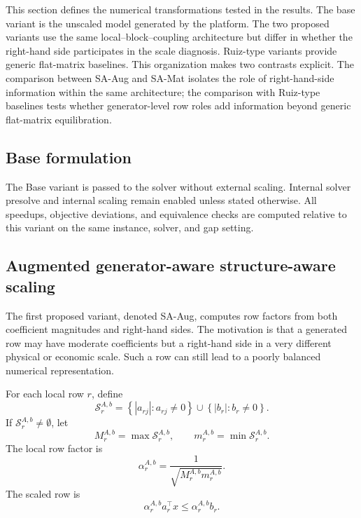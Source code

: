 \documentclass[AMA,Times1COL]{WileyNJDv5} %
\newcommand{\abs}[1]{\left\lvert #1 \right\rvert}
\newcommand{\methodBase}{Base}
\newcommand{\methodAug}{SA-Aug}
\newcommand{\methodMat}{SA-Mat}
\providecommand{\DIFadd}[1]{{\protect\color{blue} \sf #1}} %
\providecommand{\DIFdel}[1]{{\protect\color{red} \scriptsize #1}} %
\providecommand{\DIFaddbegin}{} %
\providecommand{\DIFaddend}{} %
\providecommand{\DIFdelbegin}{} %
\providecommand{\DIFdelend}{} %
\begin{document}
This section defines the numerical transformations tested in the results. The base variant is the unscaled model generated by the platform. The two proposed variants use the same local--block--coupling architecture but differ in whether the right-hand side participates in the scale diagnosis. Ruiz-type variants provide generic flat-matrix baselines. This organization makes two contrasts explicit. The comparison between \methodAug{} and \methodMat{} isolates the role of right-hand-side information within the same architecture; the comparison with Ruiz-type baselines tests whether generator-level row roles add information beyond generic flat-matrix equilibration.

\subsection{Base formulation}

The \methodBase{} variant is passed to the solver without external scaling. Internal
solver presolve and internal scaling remain enabled unless stated otherwise. All
speedups, objective deviations, and equivalence checks are computed relative to this
variant on the same instance, solver, and gap setting.

\subsection{Augmented \DIFdelbegin \DIFdel{generator-aware }\DIFdelend \DIFaddbegin \DIFadd{structure-aware }\DIFaddend scaling}
\label{subsec:strategy-1}

The first proposed variant, denoted \methodAug{}, computes row factors from both
coefficient magnitudes and right-hand sides. The motivation is that a generated row may
have moderate coefficients but a right-hand side in a very different physical or economic
scale. Such a row can still lead to a poorly balanced numerical representation.

For each local row $r$, define
\begin{equation}
\mathcal{S}_r^{A,b}
=
\left\{
\abs{a_{rj}}: a_{rj}\neq 0
\right\}
\cup
\left\{
\abs{b_r}: b_r\neq 0
\right\}.
\label{eq:augmented-set}
\end{equation}
If $\mathcal{S}_r^{A,b}\neq\emptyset$, let
\begin{equation}
M_r^{A,b}=\max \mathcal{S}_r^{A,b},
\qquad
m_r^{A,b}=\min \mathcal{S}_r^{A,b}.
\label{eq:augmented-extremes}
\end{equation}
The local row factor is
\begin{equation}
\alpha_r^{A,b}=\frac{1}{\sqrt{M_r^{A,b}m_r^{A,b}}}.
\label{eq:alpha-augmented}
\end{equation}
The scaled row is
\begin{equation}
\alpha_r^{A,b}a_r^\top x\le \alpha_r^{A,b}b_r.
\end{equation}
\end{document}
